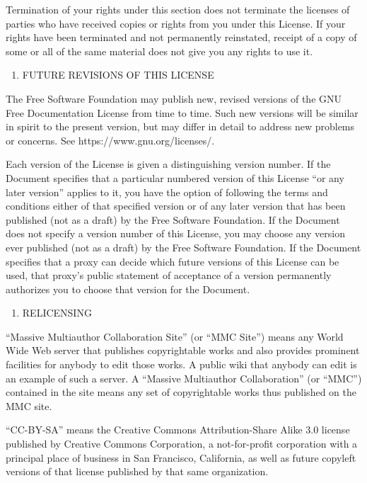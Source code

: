 \documentclass[12pt,a4paperpaper,]{report}
\providecommand{\tightlist}{%
  \setlength{\itemsep}{0pt}\setlength{\parskip}{0pt}}
\begin{document}
Termination of your rights under this section does not terminate the
licenses of parties who have received copies or rights from you under
this License. If your rights have been terminated and not permanently
reinstated, receipt of a copy of some or all of the same material does
not give you any rights to use it.

\begin{enumerate}
\def\labelenumi{\arabic{enumi}.}
\setcounter{enumi}{9}
\tightlist
\item
  FUTURE REVISIONS OF THIS LICENSE
\end{enumerate}

The Free Software Foundation may publish new, revised versions of the
GNU Free Documentation License from time to time. Such new versions will
be similar in spirit to the present version, but may differ in detail to
address new problems or concerns. See https://www.gnu.org/licenses/.

Each version of the License is given a distinguishing version number. If
the Document specifies that a particular numbered version of this
License ``or any later version'' applies to it, you have the option of
following the terms and conditions either of that specified version or
of any later version that has been published (not as a draft) by the
Free Software Foundation. If the Document does not specify a version
number of this License, you may choose any version ever published (not
as a draft) by the Free Software Foundation. If the Document specifies
that a proxy can decide which future versions of this License can be
used, that proxy's public statement of acceptance of a version
permanently authorizes you to choose that version for the Document.

\begin{enumerate}
\def\labelenumi{\arabic{enumi}.}
\setcounter{enumi}{10}
\tightlist
\item
  RELICENSING
\end{enumerate}

``Massive Multiauthor Collaboration Site'' (or ``MMC Site'') means any
World Wide Web server that publishes copyrightable works and also
provides prominent facilities for anybody to edit those works. A public
wiki that anybody can edit is an example of such a server. A ``Massive
Multiauthor Collaboration'' (or ``MMC'') contained in the site means any
set of copyrightable works thus published on the MMC site.

``CC-BY-SA'' means the Creative Commons Attribution-Share Alike 3.0
license published by Creative Commons Corporation, a not-for-profit
corporation with a principal place of business in San Francisco,
California, as well as future copyleft versions of that license
published by that same organization.
\end{document}
